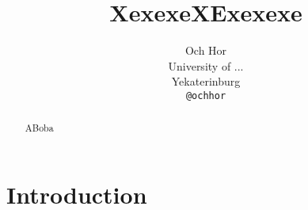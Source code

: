 \documentclass{article}
\title{XexexeXExexexe}
\author{
 Och Hor \\
  University of ...\\
  Yekaterinburg \\
  \texttt{@ochhor} \\
}
\begin{document}
\maketitle
\begin{abstract}
ABoba
\end{abstract}

\section{Introduction}




\begin{thebibliography}{1}


\end{thebibliography}
\end{document}
